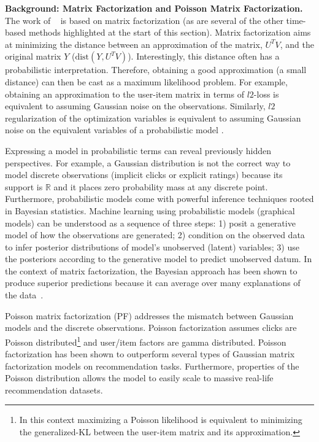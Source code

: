 \documentclass{sig-alternate}
\newcommand{\mypar}[1]{\vspace{0.1in}\noindent \textbf{#1 \,}}
\begin{document}
\mypar{Background: Matrix Factorization and Poisson Matrix Factorization.} 
\noindent The work of ~\citet{DBLP:journals/cacm/Koren10} is based on matrix 
factorization (as are several of the other time-based methods highlighted at the start of this section). 
Matrix factorization aims at minimizing the distance between an
approximation of the matrix, $U^TV$, and the original matrix $Y$
($\text{dist}(Y,U^TV)$). Interestingly, this distance often has a
probabilistic interpretation. Therefore, obtaining a good approximation
(a small distance) can then be cast as a maximum likelihood problem. For
example, obtaining an approximation to the user-item matrix in terms of
$l2$-loss is equivalent to assuming Gaussian noise on the observations.
Similarly, $l2$ regularization of the optimization variables is equivalent
to assuming Gaussian noise on the equivalent variables of a probabilistic
model \citep{bishop:2006:PRML}.

Expressing a model in probabilistic terms can reveal previously hidden
perspectives. For example, a Gaussian distribution is not the correct way
to model discrete observations (implicit clicks or explicit ratings) because its support is
$\mathbb{R}$ and it places zero probability mass at any discrete point.
Furthermore, probabilistic models come with powerful inference
techniques rooted in Bayesian statistics. Machine learning using
probabilistic models (graphical models) can be understood as a
sequence of three steps: 1) posit a generative model of how the
observations are generated; 2) condition on the observed data to infer
posterior distributions of model's unobserved (latent) variables; 3) use
the posteriors according to the generative model to predict unobserved
datum. In the context of matrix factorization, the Bayesian approach
has been shown to produce superior predictions because it can average over many explanations of the data~\citep{SalMnihICML08}.

Poisson matrix factorization (PF) \citep{Gopalan:2013b} addresses the mismatch between
Gaussian models and the discrete observations.
Poisson factorization assumes clicks are Poisson distributed\footnote{In this context maximizing a Poisson likelihood is
equivalent to minimizing the generalized-KL between the user-item matrix
and its approximation.} and user/item factors are gamma distributed. 
Poisson factorization has been shown to outperform several types of Gaussian
matrix factorization models on recommendation tasks. Furthermore,
properties of the Poisson distribution allows the model to easily scale to
massive real-life recommendation datasets. 
\end{document}
